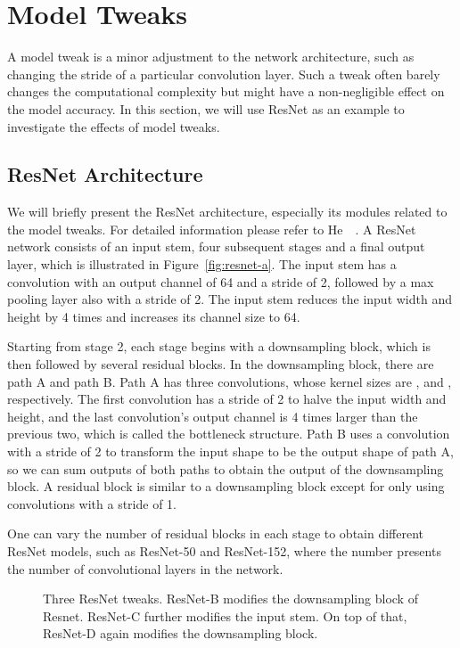 \documentclass[10pt,twocolumn,letterpaper]{article}
\begin{document}
\section{Model Tweaks}
\label{sec:arch}

A model tweak is a minor adjustment to the network architecture, such as changing
the stride of a particular convolution layer. Such a tweak often barely changes
the computational complexity but might have a non-negligible effect on
the model accuracy. In this section, we will use ResNet as an example to
investigate the effects of model tweaks.

\subsection{ResNet Architecture}

We will briefly present the ResNet architecture, especially its modules related
to the model tweaks. For detailed information please refer to He~\etal~\cite{he2016deep}.
A ResNet network consists of an input stem, four subsequent stages and a final output layer,
which is illustrated in Figure~\ref{fig:resnet-a}. The input stem has a 
convolution with an output channel of 64 and a stride of 2, followed by a
 max pooling layer also with a stride of 2. The input stem reduces the
input width and height by 4 times and increases its channel size to 64.

Starting from stage 2, each stage begins with a downsampling block, which is then followed by several
residual blocks. In the downsampling block, there are path A and path B. Path A
has three convolutions, whose kernel sizes are ,  and
, respectively. The first convolution has a stride of 2 to halve the
input width and height, and the last convolution's output channel is 4 times
larger than the previous two, which is called the bottleneck structure. Path B
uses a  convolution with a stride of 2 to transform the input shape
to be the output shape of path A, so we can sum outputs of both paths to
obtain the output of the downsampling block. A residual block is similar to a
downsampling block except for only using convolutions with a stride of 1.

One can vary the number of residual blocks in each stage to
obtain different ResNet models, such as ResNet-50 and ResNet-152, where the
number presents the number of convolutional layers in the network.

\begin{figure}[t!]
  \centering
  \hfill {}\hfill {}
  \caption{Three ResNet tweaks. ResNet-B modifies the downsampling block of Resnet. ResNet-C further modifies the input stem. On top of that, ResNet-D again modifies the downsampling block.}
  \label{fig:resnet-tweaks}
\end{figure}
\end{document}
